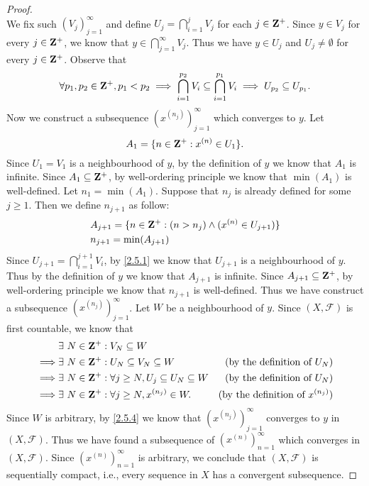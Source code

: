 \begin{proof}
\[  \]
  We fix such \((V_j)_{j = 1}^\infty\) and define \(U_j = \bigcap_{i = 1}^j V_j\) for each \(j \in \mathbf{Z}^+\).
  Since \(y \in V_j\) for every \(j \in \mathbf{Z}^+\), we know that \(y \in \bigcap_{j = 1}^\infty V_j\).
  Thus we have \(y \in U_j\) and \(U_j \neq \emptyset\) for every \(j \in \mathbf{Z}^+\).
  Observe that
  \[
    \forall p_1, p_2 \in \mathbf{Z}^+, p_1 < p_2 \implies \bigcap_{i = 1}^{p_2} V_i \subseteq \bigcap_{i = 1}^{p_1} V_i \implies U_{p_2} \subseteq U_{p_1}.
  \]
  Now we construct a subsequence \((x^{(n_j)})_{j = 1}^\infty\) which converges to \(y\).
  Let
  \[
    A_1 = \{n \in \mathbf{Z}^+ : x^{(n)} \in U_1\}.
  \]
  Since \(U_1 = V_1\) is a neighbourhood of \(y\), by the definition of \(y\) we know that \(A_1\) is infinite.
  Since \(A_1 \subseteq \mathbf{Z}^+\), by well-ordering principle we know that \(\min(A_1)\) is well-defined.
  Let \(n_1 = \min(A_1)\).
  Suppose that \(n_j\) is already defined for some \(j \geq 1\).
  Then we define \(n_{j + 1}\) as follow:
  \begin{align*}
     & A_{j + 1} = \{n \in \mathbf{Z}^+ : (n > n_j) \land (x^{(n)} \in U_{j + 1})\} \\
     & n_{j + 1} = \min(A_{j + 1})
  \end{align*}
  Since \(U_{j + 1} = \bigcap_{i = 1}^{j + 1} V_i\), by \cref{2.5.1} we know that \(U_{j + 1}\) is a neighbourhood of \(y\).
  Thus by the definition of \(y\) we know that \(A_{j + 1}\) is infinite.
  Since \(A_{j + 1} \subseteq \mathbf{Z}^+\), by well-ordering principle we know that \(n_{j + 1}\) is well-defined.
  Thus we have construct a subsequence \((x^{(n_j)})_{j = 1}^\infty\).
  Let \(W\) be a neighbourhood of \(y\).
  Since \((X, \mathcal{F})\) is first countable, we know that
  \begin{align*}
             & \exists\ N \in \mathbf{Z}^+ : V_N \subseteq W                                                                               \\
    \implies & \exists\ N \in \mathbf{Z}^+ : U_N \subseteq V_N \subseteq W                   & \text{(by the definition of \(U_N\))}       \\
    \implies & \exists\ N \in \mathbf{Z}^+ : \forall j \geq N, U_j \subseteq U_N \subseteq W & \text{(by the definition of \(U_N\))}       \\
    \implies & \exists\ N \in \mathbf{Z}^+ : \forall j \geq N, x^{(n_j)} \in W.              & \text{(by the definition of \(x^{(n_j)}\))}
  \end{align*}
  Since \(W\) is arbitrary, by \cref{2.5.4} we know that \((x^{(n_j)})_{j = 1}^\infty\) converges to \(y\) in \((X, \mathcal{F})\).
  Thus we have found a subsequence of \((x^{(n)})_{n = 1}^\infty\) which converges in \((X, \mathcal{F})\).
  Since \((x^{(n)})_{n = 1}^\infty\) is arbitrary, we conclude that \((X, \mathcal{F})\) is sequentially compact, i.e., every sequence in \(X\) has a convergent subsequence.
\end{proof}

